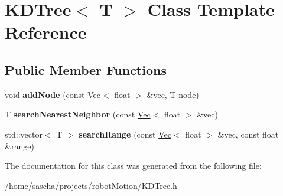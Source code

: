 \hypertarget{class_k_d_tree}{\section{K\-D\-Tree$<$ T $>$ Class Template Reference}
\label{class_k_d_tree}
}
\subsection*{Public Member Functions}
\begin{DoxyCompactItemize}
\item 
\hypertarget{class_k_d_tree_a142c48007362e5de4925261aaacd5024}{void {\bfseries add\-Node} (const \hyperlink{class_vec}{Vec}$<$ float $>$ \&vec, T node)}\label{class_k_d_tree_a142c48007362e5de4925261aaacd5024}

\item 
\hypertarget{class_k_d_tree_a30dc6a5bde4ad1cd3d2ec437a7ad83b3}{T {\bfseries search\-Nearest\-Neighbor} (const \hyperlink{class_vec}{Vec}$<$ float $>$ \&vec)}\label{class_k_d_tree_a30dc6a5bde4ad1cd3d2ec437a7ad83b3}

\item 
\hypertarget{class_k_d_tree_a657f8fcb951f49ba268ff1d15bf836dd}{std\-::vector$<$ T $>$ {\bfseries search\-Range} (const \hyperlink{class_vec}{Vec}$<$ float $>$ \&vec, const float \&range)}\label{class_k_d_tree_a657f8fcb951f49ba268ff1d15bf836dd}

\end{DoxyCompactItemize}


The documentation for this class was generated from the following file\-:\begin{DoxyCompactItemize}
\item 
/home/sascha/projects/robot\-Motion/K\-D\-Tree.\-h\end{DoxyCompactItemize}
